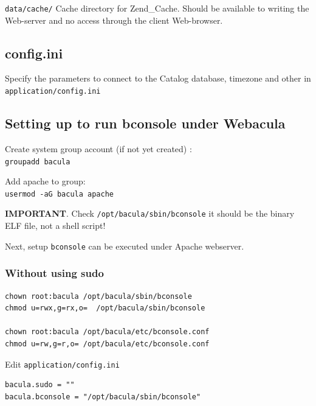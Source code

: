 \documentclass[10pt]{article}
\begin{document}
\texttt{data/cache/}  Cache directory for Zend\_Cache. Should be available to writing the Web-server and
                  no access through the client Web-browser.





\subsection{config.ini}
\label{Install:config.ini}

Specify the parameters to connect to the Catalog database, timezone and other in \texttt{application/config.ini}




\subsection{Setting up to run bconsole under Webacula}
\label{Install:Setting up to run bconsole under Webacula}

Create system group account (if not yet created) : \\
\texttt{groupadd bacula}

Add apache to group: \\
\texttt{usermod -aG bacula apache}

\textbf{IMPORTANT}. Check \texttt{/opt/bacula/sbin/bconsole} it should be the binary ELF file, not a shell script!

Next, setup \texttt{bconsole} can be executed under Apache webserver.



\subsubsection{Without using sudo}
\label{Install:Setting up to run bconsole from under Webacula:without sudo}

\begin{verbatim}
chown root:bacula /opt/bacula/sbin/bconsole
chmod u=rwx,g=rx,o=  /opt/bacula/sbin/bconsole

chown root:bacula /opt/bacula/etc/bconsole.conf
chmod u=rw,g=r,o= /opt/bacula/etc/bconsole.conf
\end{verbatim}

Edit \texttt{application/config.ini}
\begin{verbatim}
bacula.sudo = ""
bacula.bconsole = "/opt/bacula/sbin/bconsole"
\end{verbatim}
\end{document}

